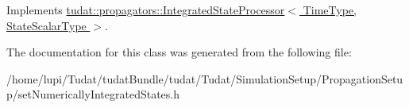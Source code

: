 Implements \hyperlink{classtudat_1_1propagators_1_1IntegratedStateProcessor_a379cb44bfbb3506b9de350719e1a05ac}{tudat\+::propagators\+::\+Integrated\+State\+Processor$<$ Time\+Type, State\+Scalar\+Type $>$}.



The documentation for this class was generated from the following file\+:\begin{DoxyCompactItemize}
\item 
/home/lupi/\+Tudat/tudat\+Bundle/tudat/\+Tudat/\+Simulation\+Setup/\+Propagation\+Setup/set\+Numerically\+Integrated\+States.\+h\end{DoxyCompactItemize}
